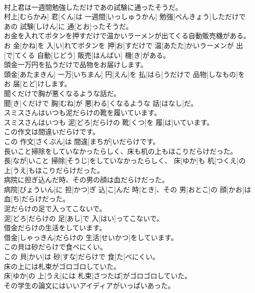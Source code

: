 \documentclass[8pt]{extreport}
\begin{document}
\begin{CJK}{UTF8}{min}
\\	村上君は一週間勉強しただけであの試験に通ったそうだ。	
\\	村上[むらかみ] 君[くん]は 一週間[いっしゅうかん] 勉強[べんきょう]しただけであの 試験[しけん]に 通[とお]ったそうだ。
\\	お金を入れてボタンを押すだけで温かいラーメンが出てくる自動販売機がある。	
\\	お 金[かね]を 入[い]れてボタンを 押[お]すだけで 温[あたた]かいラーメンが 出[で]てくる 自動[じどう] 販売[はんばい] 機[き]がある。
\\	頭金一万円を払うだけで品物をお届けします。	
\\	頭金[あたまきん] 一万[いちまん] 円[えん]を 払[はら]うだけで 品物[しなもの]をお 届[とど]けします。
\\	聞くだけで胸が悪くなるような話だ。	
\\	聞[き]くだけで 胸[むね]が 悪[わる]くなるような 話[はなし]だ。
\\	スミスさんはいつも泥だらけの靴を履いています。	
\\	スミスさんはいつも 泥[どろ]だらけの 靴[くつ]を 履[は]いています。
\\	この作文は間違いだらけです。	
\\	この 作文[さくぶん]は 間違[まちが]いだらけです。
\\	長いこと掃除をしていなかったらしく、床も机の上もほこりだらけだった。	
\\	長[なが]いこと 掃除[そうじ]をしていなかったらしく、 床[ゆか]も 机[つくえ]の 上[うえ]もほこりだらけだった。
\\	病院に担ぎ込んだ時、その男の顔は血だらけだった。	
\\	病院[びょういん]に 担[かつ]ぎ 込[こ]んだ 時[とき]、その 男[おとこ]の 顔[かお]は 血[ち]だらけだった。
\\	泥だらけの足で入ってこないで。	
\\	泥[どろ]だらけの 足[あし]で 入[はい]ってこないで。
\\	借金だらけの生活をしています。	
\\	借金[しゃっきん]だらけの 生活[せいかつ]をしています。
\\	この貝は砂だらけで食べにくい。	
\\	この 貝[かい]は 砂[すな]だらけで 食[た]べにくい。
\\	床の上には札束がゴロゴロしていた。	
\\	床[ゆか]の 上[うえ]には 札束[さつたば]がゴロゴロしていた。
\\	その学生の論文にはいいアイディアがいっぱいあった。	

\end{CJK}
\end{document}
